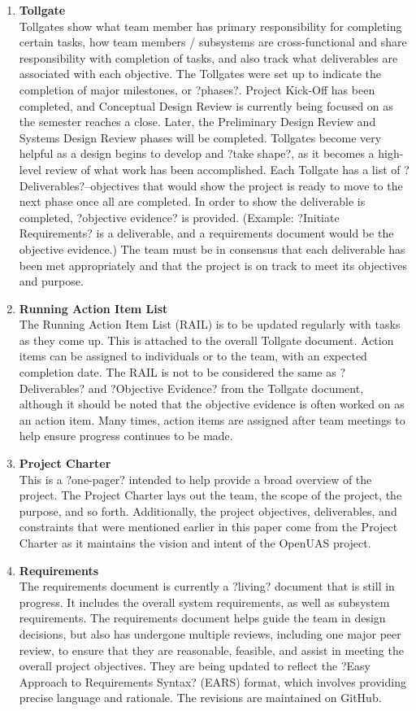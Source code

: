 ﻿\documentclass{article}
\begin{document}
\begin{enumerate}
\item \textbf{Tollgate} \\Tollgates show what team member has primary responsibility for completing certain tasks, how team members / subsystems are cross-functional and share responsibility with completion of tasks, and also track what deliverables are associated with each objective. The Tollgates were set up to indicate the completion of major milestones, or ?phases?. Project Kick-Off has been completed, and Conceptual Design Review is currently being focused on as the semester reaches a close. Later, the Preliminary Design Review and Systems Design Review phases will be completed.
Tollgates become very helpful as a design begins to develop and ?take shape?, as it becomes a high-level review of what work has been accomplished. Each Tollgate has a list of ?Deliverables?--objectives that would show the project is ready to move to the next phase once all are completed. In order to show the deliverable is completed, ?objective evidence? is provided. (Example: ?Initiate Requirements? is a deliverable, and a requirements document would be the objective evidence.) The team must be in consensus that each deliverable has been met appropriately and that the project is on track to meet its objectives and purpose.
\item \textbf{Running Action Item List} \\The Running Action Item List (RAIL) is to be updated regularly with tasks as they come up. This is attached to the overall Tollgate document. Action items can be assigned to individuals or to the team, with an expected completion date.
The RAIL is not to be considered the same as ?Deliverables? and ?Objective Evidence? from the Tollgate document, although it should be noted that the objective evidence is often worked on as an action item. Many times, action items are assigned after team meetings to help ensure progress continues to be made.
\item \textbf{Project Charter}\\ This is a ?one-pager? intended to help provide a broad overview of the project. The Project Charter lays out the team, the scope of the project, the purpose, and so forth. Additionally, the project objectives, deliverables, and constraints that were mentioned earlier in this paper come from the Project Charter as it maintains the vision and intent of the OpenUAS project.
\item \textbf{Requirements}\\ The requirements document is currently a ?living? document that is still in progress. It includes the overall system requirements, as well as subsystem requirements. The requirements document helps guide the team in design decisions, but also has undergone multiple reviews, including one major peer review, to ensure that they are reasonable, feasible, and assist in meeting the overall project objectives. They are being updated to reflect the ?Easy Approach to Requirements Syntax? (EARS) format, which involves providing precise language and rationale. The revisions are maintained on GitHub.

\end{enumerate}
\end{document}
